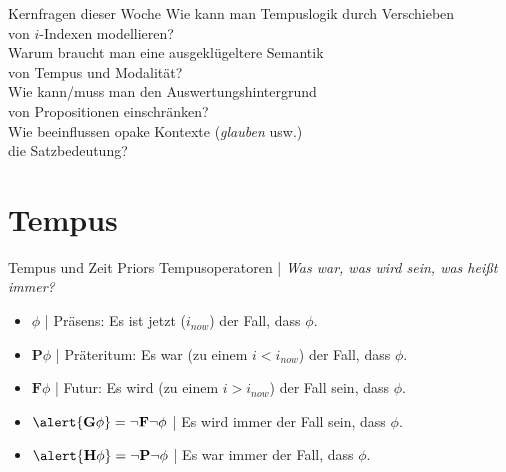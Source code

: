 \begin{frame}
  {Kernfragen dieser Woche}
  \onslide<+->
  \onslide<+->
  \Large
  \centering 
  Wie kann man Tempuslogik durch Verschieben\\ von $i$-Indexen modellieren?\\
  \Halbzeile
  \onslide<+->
  Warum braucht man eine ausgeklügeltere Semantik\\ von Tempus und Modalität?\\
  \Halbzeile
  \onslide<+->
  Wie kann\slash muss man den Auswertungshintergrund\\ von Propositionen einschränken?\\
  \Halbzeile
  \onslide<+->
  Wie beeinflussen opake Kontexte (\textit{glauben} usw.)\\ die Satzbedeutung?\\
  \onslide<+->
  \Halbzeile
\end{frame}

\section{Tempus}

\begin{frame}
  {Tempus und Zeit}
  \onslide<+->
  \onslide<+->
  Priors Tempusoperatoren | \textit{Was war, was wird sein, was heißt \alert{immer}?}\\
  \Zeile
  \begin{itemize}[<+->]
    \item \alert{$\phi$} | \alert{Präsens}: Es ist jetzt ($i_{now}$) der Fall, dass $\phi$.
    \item \alert{$\mathbf{P}\phi$} | \alert{Präteritum}: Es war (zu einem $i<i_{now}$) der Fall, dass $\phi$.
    \item \alert{$\mathbf{F}\phi$} | \alert{Futur}: Es wird (zu einem $i>i_{now}$) der Fall sein, dass $\phi$.
    \item $\alert{\mathbf{G}\phi} = \neg \mathbf{F}\neg \phi$ | Es wird immer der Fall sein, dass $\phi$.
    \item $\alert{\mathbf{H}\phi} = \neg \mathbf{P}\neg \phi$ | Es war immer der Fall, dass $\phi$.
  \end{itemize}
\end{frame}

